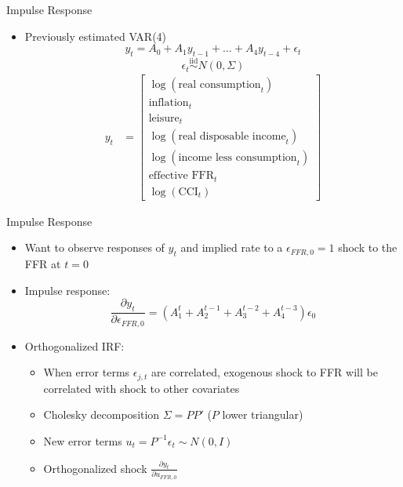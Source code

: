 \documentclass{beamer}
\begin{document}
\begin{frame}{Impulse Response}
\begin{itemize}
\item Previously estimated VAR(4)
$$y_t = A_0 + A_1 y_{t-1} + \ldots + A_4 y_{t-4} + \epsilon_t$$
$$\epsilon_t \overset{\text{iid}}{\sim} N(0, \Sigma)$$
\begin{align*}
y_t &= \begin{bmatrix} \log(\text{real consumption}_t) \\ \text{inflation}_t \\ \text{leisure}_t \\ \log(\text{real disposable income}_t) \\ \log(\text{income less consumption}_t) \\ \text{effective FFR}_t \\ \log(\text{CCI}_t) \end{bmatrix}
\end{align*}
\end{itemize}
\end{frame}

\begin{frame}{Impulse Response}
\begin{itemize}
\item Want to observe responses of $y_t$ and implied rate to a $\epsilon_{FFR,0} = 1$ shock to the FFR at $t = 0$
\item Impulse response: $$\frac{\partial y_t}{\partial \epsilon_{FFR,0}} = (A_1^t + A_2^{t-1} + A_3^{t-2} + A_4^{t-3}) \epsilon_0$$
\item Orthogonalized IRF:
  \begin{itemize}
  \item When error terms $\epsilon_{j,t}$ are correlated, exogenous shock to FFR will be correlated with shock to other covariates
  \item Cholesky decomposition $\Sigma = PP'$ ($P$ lower triangular)
  \item New error terms $u_t = P^{-1} \epsilon_t \sim N(0, I)$
  \item Orthogonalized shock $\frac{\partial y_t}{\partial u_{FFR,0}}$
  \end{itemize}
\end{itemize}
\end{frame}
\end{document}
